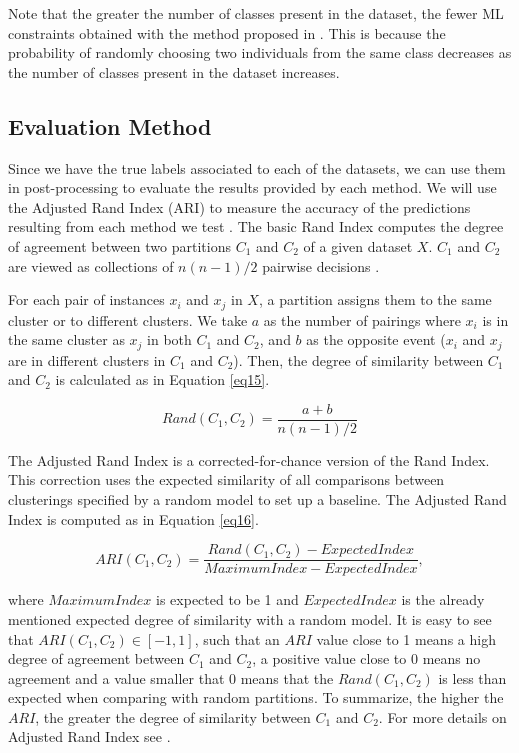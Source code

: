 \documentclass[review]{elsarticle}
\begin{document}
Note that the greater the number of classes present in the dataset, the fewer ML constraints obtained with the method proposed in \cite{wagstaff2001constrained}. This is because the probability of randomly choosing two individuals from the same class decreases as the number of classes present in the dataset increases.

\clearpage

\subsection{Evaluation Method} \label{sec:EvalMet}

Since we have the true labels associated to each of the datasets, we can use them in post-processing to evaluate the results provided by each method. We will use the Adjusted Rand Index (ARI) to measure the accuracy of the predictions resulting from each method we test \cite{hubert1985comparing}. The basic Rand Index computes the degree of agreement between two partitions $C_1$ and $C_2$ of a given dataset $X$. $C_1$ and $C_2$ are viewed as collections of $n(n - 1)/2$ pairwise decisions \cite{rand1971objective}.

For each pair of instances $x_i$ and $x_j$ in $X$, a partition assigns them to the same cluster or to different clusters. We take $a$ as the number of pairings where $x_i$ is in the same cluster as $x_j$ in both $C_1$ and $C_2$, and $b$ as the opposite event ($x_i$ and $x_j$ are in different clusters in $C_1$ and $C_2$). Then, the degree of similarity between $C_1$ and $C_2$ is calculated as in Equation \eqref{eq15}.

\begin{equation}
Rand(C_1, C_2) = \frac{a + b}{n(n - 1)/2}
\label{eq15}
\end{equation}

The Adjusted Rand Index is a corrected-for-chance version of the Rand Index. This correction uses the expected similarity of all comparisons between clusterings specified by a random model to set up a baseline. The Adjusted Rand Index is computed as in Equation \eqref{eq16}.

\begin{equation}
ARI(C_1, C_2) = \frac{Rand(C_1, C_2) - ExpectedIndex}{MaximumIndex - ExpectedIndex},
\label{eq16}
\end{equation}

\noindent where $MaximumIndex$ is expected to be 1 and $ExpectedIndex$ is the already mentioned expected degree of similarity with a random model. It is easy to see that $ARI(C_1, C_2) \in [-1,1]$, such that an $ARI$ value close to 1 means a high degree of agreement between $C_1$ and $C_2$, a positive value close to 0 means no agreement and a value smaller that 0 means that the $Rand(C_1, C_2)$ is less than expected when comparing with random partitions. To summarize, the higher the $ARI$, the greater the degree of similarity between $C_1$ and $C_2$. For more details on Adjusted Rand Index see \cite{hubert1985comparing}.
\end{document}
